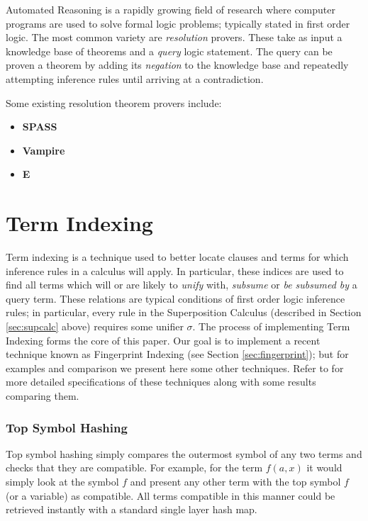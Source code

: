 Automated Reasoning is a rapidly growing field of research where computer programs
are used to solve formal logic problems; typically stated in first order logic.
The most common variety are \emph{resolution} provers. These take as input a knowledge
base of theorems and a \emph{query} logic statement. The query can be proven a theorem
by adding its \emph{negation} to the knowledge base and repeatedly attempting inference rules
until arriving at a contradiction.

Some existing resolution theorem provers include:

\begin{itemize}
\item \textbf{SPASS}
\cite{spass}
\item \textbf{Vampire}
\cite{vampire}
\item \textbf{E}
\cite{eprover}

\end{itemize}

\section{Term Indexing}
\label{sec:indexing}

Term indexing is a technique used to better locate clauses and terms for which inference rules
in a calculus will apply. In particular, these indices are used to find all terms which
will or are likely to \emph{unify} with, \emph{subsume} or \emph{be subsumed by} a query term. These relations are typical conditions
of first order logic inference rules; in particular, every rule in the Superposition Calculus
(described in Section \ref{sec:supcalc} above) requires some unifier $\sigma$.
The process of implementing Term Indexing forms the core of this paper. Our goal
is to implement a recent technique known as Fingerprint Indexing (see Section \ref{sec:fingerprint});
but for examples and comparison we present here some other techniques.
Refer to \cite{indexing} for more detailed specifications of these techniques along
with some results comparing them.

\subsubsection{Top Symbol Hashing}
Top symbol hashing simply compares the outermost symbol of any two terms and checks
that they are compatible. For example, for the term $f(a,x)$ it would simply look
at the symbol $f$ and present any other term with the top symbol $f$ (or a variable) as compatible.
All terms compatible in this manner could be retrieved instantly with a standard
single layer hash map.

